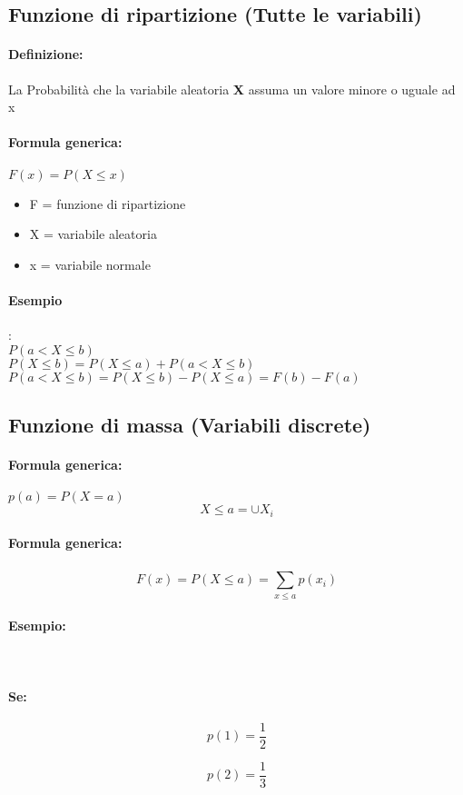 \documentclass[]{article}
\newcommand{\definizione}{\paragraph{Definizione:}}
\newcommand{\formula}{\paragraph{Formula generica:}}
\begin{document}
    \subsection{Funzione di ripartizione (Tutte le variabili)}
    \definizione
    La Probabilità che la variabile aleatoria \textbf{X} assuma un valore minore o uguale ad x
    \formula $ F(x) = P(X \leq x) $
    \begin{itemize}
        \item F = funzione di ripartizione
        \item X = variabile aleatoria
        \item x = variabile normale
    \end{itemize}
    
    \paragraph{Esempio}:  \\
    \linebreak[4]
    $ P(a < X \leq b) $ \\
    \linebreak[4]
    $ P(X \leq b) = P(X \leq a) + P(a < X \leq b) $ \\
    \linebreak[4]
    $ P(a < X \leq b) = P(X \leq b) - P(X \leq a) = F(b) - F(a) $
    
  
    \subsection{Funzione di massa (Variabili discrete)}
    \formula $p(a) = P(X = a) $ \\
    \linebreak[4]
    \[ X \leq a = \cup X_i \]
    \formula \[ F(x) = P(X \leq a) = \sum_{x \leq a}^{} p(x_i) \]
    \paragraph{Esempio:}  \\
    \paragraph{Se:}
    \begin{minipage}{0.45\textwidth}
        \[ p(1) = \frac{1}{2} \]
    \end{minipage}
    \begin{minipage}{0.45\textwidth}
        \[ p(2) = \frac{1}{3} \]
    \end{minipage}
    
\end{document}
